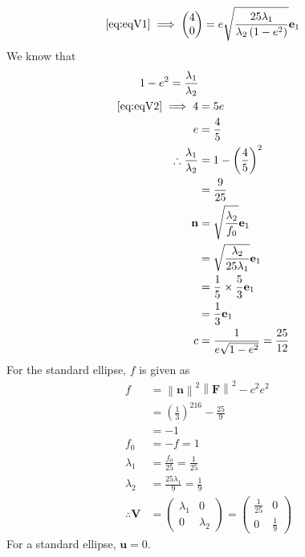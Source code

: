 \documentclass[12pt]{article}
\providecommand{\brak}[1]{\ensuremath{\left(#1\right)}}
\providecommand{\norm}[1]{\left\lVert#1\right\rVert}
\newcommand{\myvec}[1]{\ensuremath{\begin{pmatrix}#1\end{pmatrix}}}
\let\vec\mathbf
\begin{document}
\begin{enumerate}
\begin{align}
	   \label{eq:eqV2}
	   \eqref{eq:eqV1} \implies \myvec{4 \\0}  &=e\sqrt{\frac{25\lambda_1}{\lambda_2\brak{1-e^2}}}\vec{e}_1
\end{align}
We know that 
\begin{align}
	1-e^2 = \frac{\lambda_1}{\lambda_2} \\
	\eqref{eq:eqV2} \implies  4 &= 5e \\
        e &= \frac{4}{5} \\
	\therefore \frac{\lambda_1}{\lambda_2} &= 1 - \brak{\frac{4}{5}}^2 \\
	&= \frac{9}{25} \\
	\vec{n} &= \sqrt{\frac{\lambda_2}{f_0}}\vec{e}_1\\
	 &= \sqrt{\frac{\lambda_2}{25\lambda_1}}\vec{e}_1\\
	 &= \frac{1}{5} \times \frac{5}{3}\vec{e}_1\\
	 &= \frac{1}{3}\vec{e}_1 \\
	 c &= \frac{1}{e\sqrt{1-e^2}} = \frac{25}{12}
\end{align}
For the standard ellipse, $f$ is given as 
\begin{align}
	\label{eq:eqV3}
	f &= \norm{\vec{n}}^2 \norm{\vec{F}}^2 - c^2 e^2 \\
	&= \brak{\frac{1}{3}}^216 - \frac{25}{9} \\
	&= -1 \\
	f_0 &= -f = 1 \\
	\lambda_1 &= \frac{f_0}{25} = \frac{1}{25}\\
	\lambda_2 &= \frac{25\lambda_1}{9} = \frac{1}{9} \\
	\therefore \vec{V} &= \myvec{\lambda_1 & 0 \\ 0 & \lambda_2} = \myvec{\frac{1}{25} & 0 \\ 0 & \frac{1}{9}}
\end{align}
For a standard ellipse, $\vec{u}=0$. 


\end{enumerate}
\end{document}
